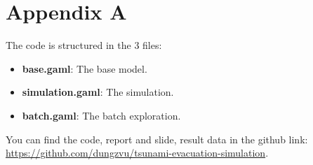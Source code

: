 \documentclass[12pt]{article}
\begin{document}
\section*{Appendix A}

The code is structured in the 3 files:
\begin{itemize}
    \item \textbf{base.gaml}: The base model.
    \item \textbf{simulation.gaml}: The simulation.
    \item \textbf{batch.gaml}: The batch exploration.
\end{itemize}

You can find the code, report and slide, result data in the github link: \url{https://github.com/dungzvu/tsunami-evacuation-simulation}.
\end{document}
